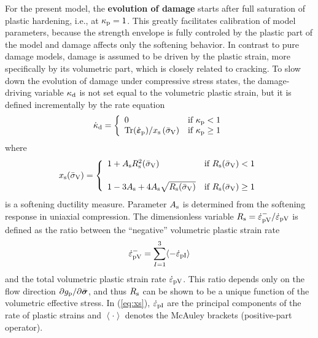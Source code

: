 \documentclass[a4paper]{article}
\newcommand{\mbf}[1]{\mbox{\boldmath$#1$}}
\newcommand{\veps}{\mbf{\varepsilon}}  %
\newcommand{\vsig}{\mbf{\sigma}}%
\begin{document}
For the present model, the {\bf evolution of damage} starts after full saturation of plastic hardening, i.e., at $\kappa_{\rm p}=1$. This greatly facilitates calibration of model parameters, because the strength envelope is fully controled by the plastic part of the model and damage affects only the softening behavior.
In contrast to pure damage models,
damage is assumed to be driven by the plastic strain, more
specifically by its volumetric part, which is closely related 
to cracking. To slow down the evolution of damage under compressive stress states,
the damage-driving variable $\kappa_{\rm d}$ is not set equal to the volumetric
plastic strain, but it is defined incrementally by the rate equation
%
\begin{equation}\label{eq:equivStrain}
\dot{\kappa}_{\rm d} = \left\{ \begin{array}{ll}
0 & \mbox{if $\kappa_{\rm p}< 1$} \\
{\rm Tr}(\dot{\veps}_{\rm p})/x_{\rm s}\left(\bar{\sigma}_{\rm V}\right) & \mbox{if $\kappa_{\rm p}\ge 1$}
\end{array}
 \right.
\end{equation}
where
\begin{equation}\label{eq:damageDuctility}
x_{\rm s}(\bar{\sigma}_{\rm V}) = \left\{\begin{array}{ll}
1 + A_{\rm s}R_{\rm s}^2(\bar{\sigma}_{\rm V}) & \mbox{if $R_{\rm s}(\bar{\sigma}_{\rm V}) < 1$}\\[5mm]
1 - 3 A_{\rm s} + 4 A_{\rm s} \sqrt{R_{\rm s}(\bar{\sigma}_{\rm V})} & \mbox{if $R_{\rm s}(\bar{\sigma}_{\rm V}) \geq 1$}
\end{array}
\right .
\end{equation}
is a softening ductility measure.
Parameter $A_{\rm s}$ is determined from the softening response in uniaxial compression. The dimensionless variable
$R_{\rm s}=\dot{\varepsilon}_{\rm pV}^{-}/\dot{\varepsilon}_{\rm {pV}}$ is defined as the ratio between the ``negative'' volumetric plastic strain rate
%
\begin{equation}\label{eq:xs}
\dot{\varepsilon}_{\rm pV}^{-} = \displaystyle{\sum_{I = 1}^3 \langle-\dot{\varepsilon}_{\rm{p}I}\rangle}
\end{equation}
%
and the total volumetric plastic strain rate $\dot{\varepsilon}_{\rm {pV}}$.
This ratio depends only on the flow direction $\partial g_{\rm p}/\partial\bar{\vsig}$, and thus
$R_{\rm s}$ can be shown to be a unique function of the volumetric effective stress. In (\ref{eq:xs}), $\dot{\varepsilon}_{\rm{p}I}$ are the principal components of the rate of plastic strains and $\left<\cdot\right>$ denotes the McAuley brackets (positive-part operator).
\end{document}
